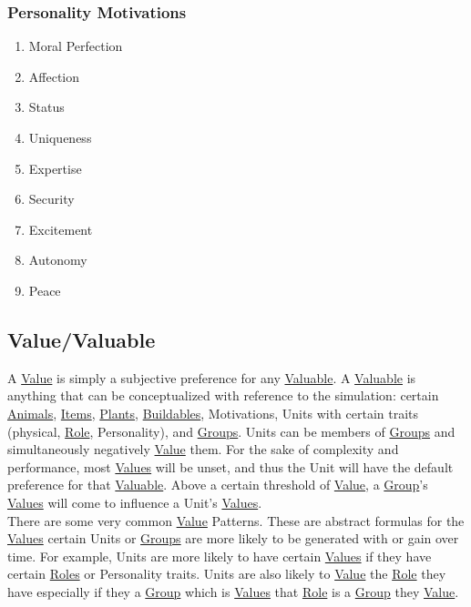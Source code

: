 \documentclass[11pt]{article}
\begin{document}
\subsubsection{Personality Motivations}
\label{sec:orgbe69ac4}
\begin{enumerate}
\item Moral Perfection
\label{sec:orged67049}
\item Affection
\label{sec:org9a3fa71}
\item Status
\label{sec:org79c2871}
\item Uniqueness
\label{sec:org04c97b1}
\item Expertise
\label{sec:orgda991e4}
\item Security
\label{sec:org33cc739}
\item Excitement
\label{sec:org33581ad}
\item Autonomy
\label{sec:org1770dc6}
\item Peace
\label{sec:org6f8d535}
\end{enumerate}
\subsection{Value\label{orgcfc0c4f}\label{orge4a3133}/Valuable\label{orgc4da326}\label{orgc3a1da5}}
\label{sec:org7eb7be5}
A \hyperref[orgcfc0c4f]{Value} is simply a subjective preference for any \hyperref[orgc4da326]{Valuable}. A \hyperref[orgc4da326]{Valuable} is anything that can be conceptualized with reference to the simulation: certain \hyperref[orgb1f888f]{Animals}, \hyperref[org4612467]{Items}, \hyperref[org6e70fa0]{Plants}, \hyperref[orgb7b8c78]{Buildables}, Motivations, Units with certain traits (physical, \hyperref[orgada42dd]{Role}, Personality), and \hyperref[org21e4d88]{Groups}. Units can be members of \hyperref[org21e4d88]{Groups} and simultaneously negatively \hyperref[orgcfc0c4f]{Value} them. For the sake of complexity and performance, most \hyperref[orge4a3133]{Values} will be unset, and thus the Unit will have the default preference for that \hyperref[orgc4da326]{Valuable}. Above a certain threshold of \hyperref[orgcfc0c4f]{Value}, a \hyperref[org3bac9f0]{Group}'s \hyperref[orge4a3133]{Values} will come to influence a Unit's \hyperref[orge4a3133]{Values}.\\

There are some very common \hyperref[orgcfc0c4f]{Value} Patterns. These are abstract formulas for the \hyperref[orge4a3133]{Values} certain Units or \hyperref[org21e4d88]{Groups} are more likely to be generated with or gain over time. For example, Units are more likely to have certain \hyperref[orge4a3133]{Values} if they have certain \hyperref[org080bb13]{Roles} or Personality traits. Units are also likely to \hyperref[orgcfc0c4f]{Value} the \hyperref[orgada42dd]{Role} they have especially if they a \hyperref[org3bac9f0]{Group} which is \hyperref[orge4a3133]{Values} that \hyperref[orgada42dd]{Role} is a \hyperref[org3bac9f0]{Group} they \hyperref[orgcfc0c4f]{Value}.\\
\end{document}
